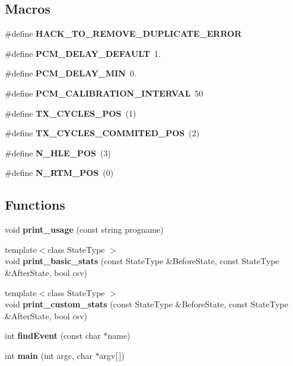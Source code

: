 \subsection*{Macros}
\begin{DoxyCompactItemize}
\item 
\mbox{\label{pcm-tsx_8cpp_ac4eeb11d89b0f517835a12a04443ebe4}} 
\#define {\bfseries H\+A\+C\+K\+\_\+\+T\+O\+\_\+\+R\+E\+M\+O\+V\+E\+\_\+\+D\+U\+P\+L\+I\+C\+A\+T\+E\+\_\+\+E\+R\+R\+OR}
\item 
\mbox{\label{pcm-tsx_8cpp_aa9ecc55c90c7a69729babc4f5f91ed96}} 
\#define {\bfseries P\+C\+M\+\_\+\+D\+E\+L\+A\+Y\+\_\+\+D\+E\+F\+A\+U\+LT}~1.
\item 
\mbox{\label{pcm-tsx_8cpp_acccbe8441d6dd75bdc949f5f0ee126c5}} 
\#define {\bfseries P\+C\+M\+\_\+\+D\+E\+L\+A\+Y\+\_\+\+M\+IN}~0.
\item 
\mbox{\label{pcm-tsx_8cpp_a433dde946b6713059756318598c9a6fe}} 
\#define {\bfseries P\+C\+M\+\_\+\+C\+A\+L\+I\+B\+R\+A\+T\+I\+O\+N\+\_\+\+I\+N\+T\+E\+R\+V\+AL}~50
\item 
\mbox{\label{pcm-tsx_8cpp_addbd44927f4db32cabe5120a93739d9b}} 
\#define {\bfseries T\+X\+\_\+\+C\+Y\+C\+L\+E\+S\+\_\+\+P\+OS}~(1)
\item 
\mbox{\label{pcm-tsx_8cpp_a6013ef04cedfcf54d163fae819cefbd1}} 
\#define {\bfseries T\+X\+\_\+\+C\+Y\+C\+L\+E\+S\+\_\+\+C\+O\+M\+M\+I\+T\+E\+D\+\_\+\+P\+OS}~(2)
\item 
\mbox{\label{pcm-tsx_8cpp_ae781e339bd97f8539c4c52a7f8aeb6db}} 
\#define {\bfseries N\+\_\+\+H\+L\+E\+\_\+\+P\+OS}~(3)
\item 
\mbox{\label{pcm-tsx_8cpp_a7b2ca9f81e64b26449fefab2789a257c}} 
\#define {\bfseries N\+\_\+\+R\+T\+M\+\_\+\+P\+OS}~(0)
\end{DoxyCompactItemize}
\subsection*{Functions}
\begin{DoxyCompactItemize}
\item 
\mbox{\label{pcm-tsx_8cpp_a4e43544978d9afb2faf08dce11cab70c}} 
void {\bfseries print\+\_\+usage} (const string progname)
\item 
\mbox{\label{pcm-tsx_8cpp_a5ded5e5cf069617e10262bf55eef2755}} 
{\footnotesize template$<$class State\+Type $>$ }\\void {\bfseries print\+\_\+basic\+\_\+stats} (const State\+Type \&Before\+State, const State\+Type \&After\+State, bool csv)
\item 
\mbox{\label{pcm-tsx_8cpp_a50e3da3c8c576ec27ac14afcb226717f}} 
{\footnotesize template$<$class State\+Type $>$ }\\void {\bfseries print\+\_\+custom\+\_\+stats} (const State\+Type \&Before\+State, const State\+Type \&After\+State, bool csv)
\item 
\mbox{\label{pcm-tsx_8cpp_a6c01bd81dd058f924885a7ba93c94dcc}} 
int {\bfseries find\+Event} (const char $\ast$name)
\item 
\mbox{\label{pcm-tsx_8cpp_a0ddf1224851353fc92bfbff6f499fa97}} 
int {\bfseries main} (int argc, char $\ast$argv[$\,$])
\end{DoxyCompactItemize}
